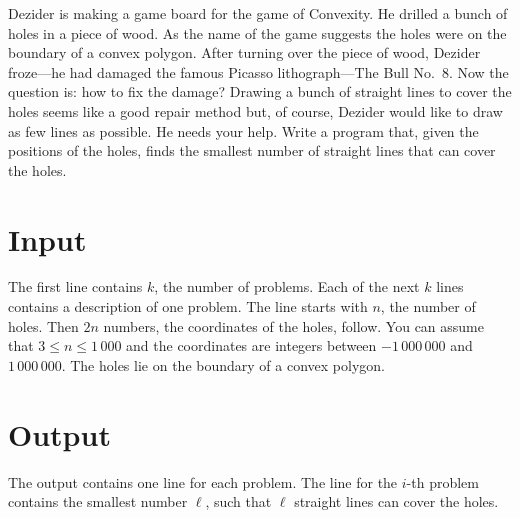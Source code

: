 
Dezider is making a game board for the game of Convexity. He drilled a
bunch of holes in a piece of wood. As the name of the game suggests
the holes were on the boundary of a convex polygon. After turning over
the piece of wood, Dezider froze---he had damaged the famous Picasso
lithograph---The Bull No.~8. Now the question is: how to fix the
damage?  Drawing a bunch of straight lines to cover the holes seems
like a good repair method but, of course, Dezider would like to draw
as few lines as possible. He needs your help. Write a program that,
given the positions of the holes, finds the smallest number of
straight lines that can cover the holes.


\section*{Input}

The first line contains $k$, the number of problems. Each of the next
$k$ lines contains a description of one problem. The line starts with
$n$, the number of holes. Then $2n$ numbers, the coordinates of the
holes, follow. You can assume that $3 \leq n \leq 1\,000$ and the
coordinates are integers between $-1\,000\,000$ and $1\,000\,000$. The
holes lie on the boundary of a convex polygon.


\section*{Output}

The output contains one line for each problem. The line for the $i$-th problem contains the
smallest number $\ell$, such that $\ell$ straight lines can cover the holes.
